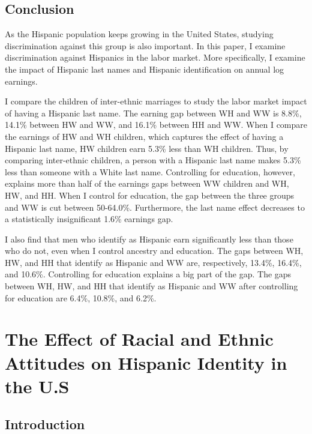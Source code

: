 \documentclass[12pt, fullpage]{article}
\begin{document}
\subsection{Conclusion}\label{sec:con}

As the Hispanic population keeps growing in the United States, studying discrimination against this group is also important. In this paper, I examine discrimination against Hispanics in the labor market. More specifically, I examine the impact of Hispanic last names and Hispanic identification on annual log earnings. 

I compare the children of inter-ethnic marriages to study the labor market impact of having a Hispanic last name. The earning gap between WH and WW is 8.8\%, 14.1\% between HW and WW, and 16.1\% between HH and WW. When I compare the earnings of HW and WH children, which captures the effect of having a Hispanic last name, HW children earn 5.3\% less than WH children. Thus, by comparing inter-ethnic children, a person with a Hispanic last name makes 5.3\% less than someone with a White last name. Controlling for education, however, explains more than half of the earnings gaps between WW children and WH, HW, and HH. When I control for education, the gap between the three groups and WW is cut between 50-64.0\%. Furthermore, the last name effect decreases to a statistically insignificant 1.6\% earnings gap.

I also find that men who identify as Hispanic earn significantly less than those who do not, even when I control ancestry and education. The gaps between WH, HW, and HH that identify as Hispanic and WW are, respectively, 13.4\%, 16.4\%, and 10.6\%. Controlling for education explains a big part of the gap. The gaps between WH, HW, and HH that identify as Hispanic and WW after controlling for education are 6.4\%, 10.8\%, and 6.2\%. 

\pagebreak
\newpage

\section[\bf \uppercase{The Effect of Racial and Ethnic Attitudes on Hispanic Identity in the U.S}]{The Effect of Racial and Ethnic Attitudes on Hispanic Identity in the U.S}

\subsection{Introduction}\label{sec:intro}
\end{document}
